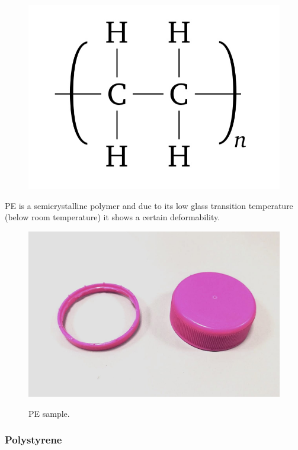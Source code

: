 \documentclass[a4paper, 11pt]{article}
\begin{document}
\begin{figure}[htp]
	\centering
	{\includegraphics[scale=0.3]{pe_chem}}
	\captionsetup{justification=centering}
	\label{fig:PE}
\end{figure}
PE is a semicrystalline polymer and due to its low glass transition temperature (below room temperature) it shows a certain deformability.
\begin{figure}[htp]
	\centering
	{\includegraphics[scale=0.15]{PE}}
	\captionsetup{justification=centering}
	\caption{PE sample.}
	\label{fig:PE}
\end{figure}

\newpage

\subsubsection{Polystyrene}
\end{document}
